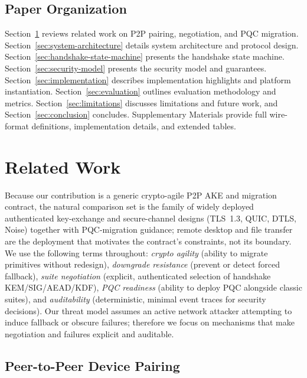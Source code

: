 \documentclass[10pt,journal,compsoc]{IEEEtran}
\begin{document}
\subsection{Paper Organization}\label{b.-paper-organization}

Section~\ref{sec:related-work} reviews related work on P2P pairing,
negotiation, and PQC migration. Section~\ref{sec:system-architecture}
details system architecture and protocol design.
Section~\ref{sec:handshake-state-machine} presents the handshake state
machine. Section~\ref{sec:security-model} presents the security model
and guarantees. Section~\ref{sec:implementation} describes
implementation highlights and platform instantiation. Section~\ref{sec:evaluation}
outlines evaluation methodology and metrics. Section~\ref{sec:limitations}
discusses limitations and future work, and Section~\ref{sec:conclusion}
concludes. Supplementary Materials provide full wire-format definitions,
implementation details, and extended tables.



\section{Related Work}\label{sec:related-work}

Because our contribution is a generic crypto-agile P2P AKE and migration
contract, the natural comparison set is the family of widely deployed
authenticated key-exchange and secure-channel designs (TLS~1.3, QUIC,
DTLS, Noise) together with PQC-migration guidance; remote desktop and
file transfer are the deployment that motivates the contract's
constraints, not its boundary. We use the following terms throughout:
\emph{crypto agility} (ability to migrate primitives without redesign),
\emph{downgrade resistance} (prevent or detect forced fallback),
\emph{suite negotiation} (explicit, authenticated selection of handshake
KEM/SIG/AEAD/KDF), \emph{PQC readiness} (ability to deploy PQC alongside
classic suites), and \emph{auditability} (deterministic, minimal event
traces for security decisions). Our threat model assumes an active
network attacker attempting to induce fallback or obscure failures;
therefore we focus on mechanisms that make negotiation and failures
explicit and auditable.

\subsection{Peer-to-Peer Device
Pairing}\label{a.-peer-to-peer-device-pairing}
\end{document}
